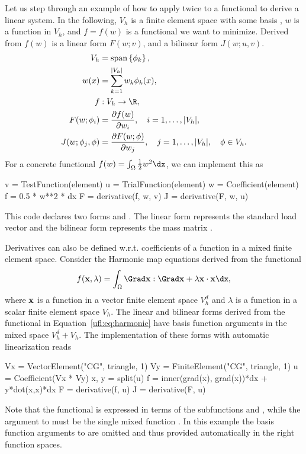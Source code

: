 Let us step through an example of how to apply  twice
to a functional to derive a linear system.  In the following, $V_h$
is a finite element space with some basis , $w$ is a function in $V_h$,
and $f = f(w)$ is a functional we want to minimize. Derived from $f(w)$
is a linear form $F(w; v)$, and a bilinear form $J(w; u, v)$.
\begin{align}
V_h &= \spans{ \phi_k }, \\
w(x) &= \sum_{k=1}^{|V_h|} w_k \phi_k(x), \\
f&: V_h \rightarrow \R, \\
F(w; \phi_i) &= \frac{\partial f(w)}{\partial w_i},
  \quad i=1,\ldots,|V_h|, \\
J(w; \phi_j, \phi) &= \frac{\partial F(w; \phi)}{\partial w_j},
  \quad j=1,\ldots,|V_h|, \quad \phi\in V_h.
\end{align}
For a concrete functional $f(w) = \int_\Omega \frac 1 2 w^2 \dx$, we
can implement this as
\begin{python}
v = TestFunction(element)
u = TrialFunction(element)
w = Coefficient(element)
f = 0.5 * w**2 * dx
F = derivative(f, w, v)
J = derivative(F, w, u)
\end{python}
This code declares two forms  and .  The linear form 
represents the standard load vector  and the bilinear form
 represents the mass matrix .

Derivatives can also be defined w.r.t. coefficients of a function in a
mixed finite element space.  Consider the Harmonic map equations derived
from the functional
\begin{align} \label{ufl:eq:harmonic}
f(\xx, \lambda) = \int_\Omega \Grad \xx : \Grad \xx + \lambda \xx\cdot\xx \dx,
\end{align}
where $\mathbf{x}$ is a function in a vector finite element space $V_h^d$
and $\lambda$ is a function in a scalar finite element space
$V_h$.  The linear and bilinear forms derived from the functional in
Equation~\ref{ufl:eq:harmonic} have basis function arguments in the mixed
space $V_h^d + V_h$.  The implementation of these forms with automatic
linearization reads
\begin{python}
Vx = VectorElement("CG", triangle, 1)
Vy = FiniteElement("CG", triangle, 1)
u = Coefficient(Vx * Vy)
x, y = split(u)
f = inner(grad(x), grad(x))*dx + y*dot(x,x)*dx
F = derivative(f, u)
J = derivative(F, u)
\end{python}
Note that the functional is expressed in terms of the subfunctions 
and , while the argument to  must be the single
mixed function .  In this example the basis function arguments
to  are omitted and thus provided automatically in the
right function spaces.

